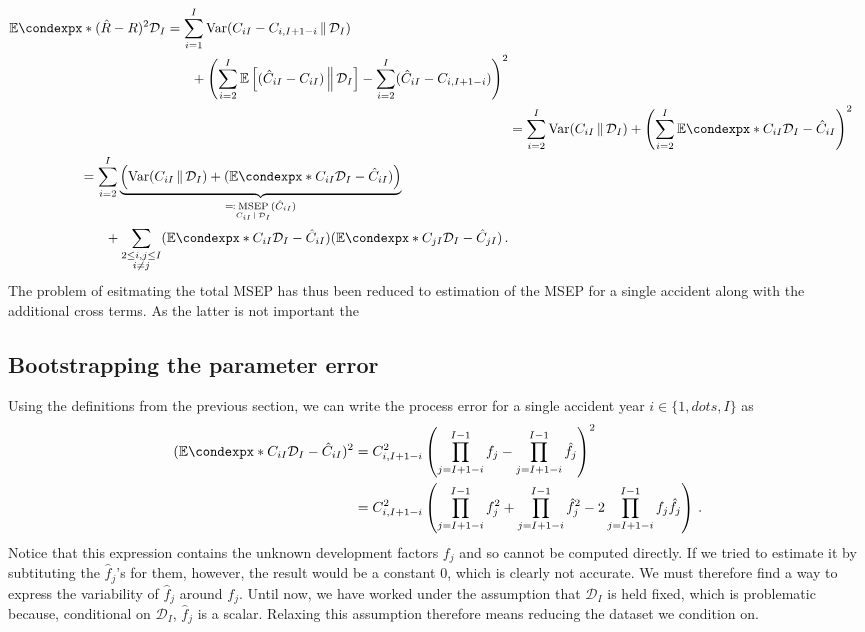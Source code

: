\documentclass[a4paper]{book}
\theoremstyle{plain}
\newcommand{\condexp}{\mathbb{E}\condexpx}
\begin{document}
\begin{align}
    \begin{split}
    \condexp*{(\hat{R} - R)^2}{\mathcal{D}_I} &=
        \sum_{i=1}^I \mathrm{Var}(C_{iI} - C_{i, I + 1 - i} \, \Vert \, \mathcal{D}_I) \\ 
        &\phantom{{}=1} + \left( \sum_{i=2}^I \mathbb{E} \left[ (\hat{C}_{iI} - C_{iI}) \, \Big \rVert \, \mathcal{D}_I \right] - \sum_{i=2}^I (\hat{C}_{iI} - C_{i, I + 1 - i}) \right)^2
    \end{split} \\
    &= \sum_{i=2}^I \mathrm{Var}(C_{iI} \, \Vert \, \mathcal{D}_I) + \left( \sum_{i=2}^I \condexp*{C_{iI}}{\mathcal{D}_I} - \hat{C}_{iI} \right)^2 \\
    \begin{split}
    &= \sum_{i=2}^I \underbrace{\left(\mathrm{Var}(C_{iI} \, \Vert \, \mathcal{D}_I) + (\condexp*{C_{iI}}{\mathcal{D}_I} - \hat{C}_{iI}) \right)}_{\eqqcolon \underset{C_{iI} \, \vert \, \mathcal{D}_I}{\mathrm{MSEP}}(\hat{C}_{iI})} \\
    &\phantom{{}=1} + \sum_{\substack{2 \leq i, j \leq I \\ i \neq j}} (\condexp*{C_{iI}}{\mathcal{D}_I} - \hat{C}_{iI})(\condexp*{C_{jI}}{\mathcal{D}_I} - \hat{C}_{jI}) \,.
    \end{split}
\end{align}
The problem of esitmating the total MSEP has thus been reduced to estimation of the MSEP for a single accident along with the additional cross terms. As the latter is not important the 

\subsection{Bootstrapping the parameter error}

Using the definitions from the previous section, we can write the process error for a single accident year $i \in \{ 1, 
dots, I \}$ as
\begin{align}
    (\condexp*{C_{iI}}{\mathcal{D}_I} - \hat{C}_{iI})^2 &= C^2_{i, I+1-i} \left( \prod_{j=I+1-i}^{I-1}f_j - \prod_{j=I+1-i}^{I-1}\hat{f}_j \right)^2 \\
    \label{procerr}%
    &= C^2_{i, I+1-i} \left( \prod_{j=I+1-i}^{I-1}f^2_j + \prod_{j=I+1-i}^{I-1}\hat{f}^2_j - 2 \prod_{j=I+1-i}^{I-1}f_j \hat{f}_j \right) \,.
\end{align}
Notice that this expression contains the unknown development factors $f_j$ and so cannot be computed directly. If we tried to estimate it by subtituting the $\hat{f}_j$'s for them, however, the result would be a constant $0$, which is clearly not accurate. We must therefore find a way to express the variability of $\hat{f}_j$ around $f_j$. Until now, we have worked under the assumption that $\mathcal{D}_I$ is held fixed, which is problematic because, conditional on $\mathcal{D}_I$, $\hat{f}_j$ is a scalar. Relaxing this assumption therefore means reducing the dataset we condition on.
\end{document}

